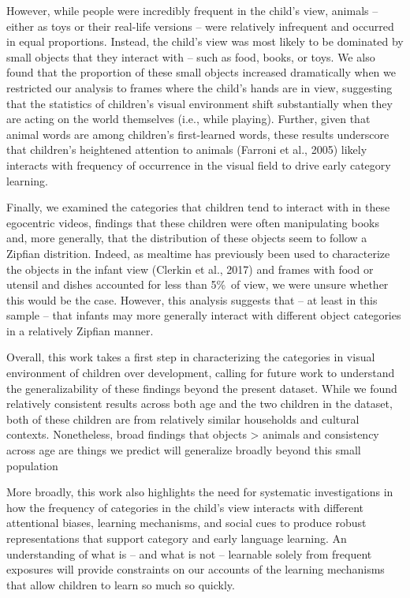 \documentclass[10pt, letterpaper]{article}
\begin{document}
However, while people were incredibly frequent in the child's view,
animals -- either as toys or their real-life versions -- were relatively
infrequent and occurred in equal proportions. Instead, the child's view
was most likely to be dominated by small objects that they interact with
-- such as food, books, or toys. We also found that the proportion of
these small objects increased dramatically when we restricted our
analysis to frames where the child's hands are in view, suggesting that
the statistics of children's visual environment shift substantially when
they are acting on the world themselves (i.e., while playing). Further,
given that animal words are among children's first-learned words, these
results underscore that children's heightened attention to animals
(Farroni et al., 2005) likely interacts with frequency of occurrence in
the visual field to drive early category learning.

Finally, we examined the categories that children tend to interact with
in these egocentric videos, findings that these children were often
manipulating books and, more generally, that the distribution of these
objects seem to follow a Zipfian distrition. Indeed, as mealtime has
previously been used to characterize the objects in the infant view
(Clerkin et al., 2017) and frames with food or utensil and dishes
accounted for less than 5\%~of view, we were unsure whether this would
be the case. However, this analysis suggests that -- at least in this
sample -- that infants may more generally interact with different object
categories in a relatively Zipfian manner.

Overall, this work takes a first step in characterizing the categories
in visual environment of children over development, calling for future
work to understand the generalizability of these findings beyond the
present dataset. While we found relatively consistent results across
both age and the two children in the dataset, both of these children are
from relatively similar households and cultural contexts. Nonetheless,
broad findings that objects \textgreater{} animals and consistency
across age are things we predict will generalize broadly beyond this
small population

More broadly, this work also highlights the need for systematic
investigations in how the frequency of categories in the child's view
interacts with different attentional biases, learning mechanisms, and
social cues to produce robust representations that support category and
early language learning. An understanding of what is -- and what is not
-- learnable solely from frequent exposures will provide constraints on
our accounts of the learning mechanisms that allow children to learn so
much so quickly.
\end{document}
